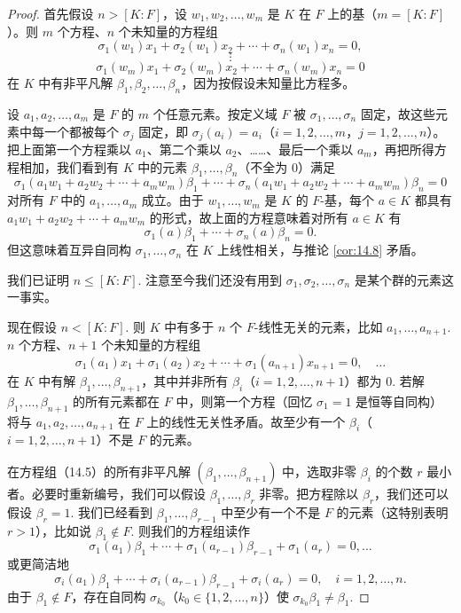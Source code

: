 \begin{proof}
首先假设 \(n > [K:F]\)，设 \(w_1, w_2, \ldots, w_m\) 是 \(K\) 在 \(F\) 上的基（\(m = [K:F]\)）。则 \(m\) 个方程、\(n\) 个未知量的方程组
\[
\sigma_1(w_1)x_1+\sigma_2(w_1)x_2+\cdots+\sigma_n(w_1)x_n = 0,
\]
\[
\vdots
\]
\[
\sigma_1(w_m)x_1+\sigma_2(w_m)x_2+\cdots+\sigma_n(w_m)x_n = 0
\]
在 \(K\) 中有非平凡解 \(\beta_1, \beta_2, \ldots, \beta_n\)，因为按假设未知量比方程多。

设 \(a_1, a_2, \ldots, a_m\) 是 \(F\) 的 \(m\) 个任意元素。按定义域 \(F\) 被 \(\sigma_1, \ldots, \sigma_n\) 固定，故这些元素中每一个都被每个 \(\sigma_j\) 固定，即 \(\sigma_j(a_i) = a_i\)（\(i = 1, 2, \ldots, m\)，\(j = 1, 2, \ldots, n\)）。把上面第一个方程乘以 \(a_1\)、第二个乘以 \(a_2\)、……、最后一个乘以 \(a_m\)，再把所得方程相加，我们看到有 \(K\) 中的元素 \(\beta_1, \ldots, \beta_n\)（不全为 0）满足
\[
\sigma_1(a_1w_1+a_2w_2+\cdots+a_mw_m)\beta_1+\cdots+\sigma_n(a_1w_1+a_2w_2+\cdots+a_mw_m)\beta_n = 0
\]
对所有 \(F\) 中的 \(a_1, \ldots, a_m\) 成立。由于 \(w_1, \ldots, w_m\) 是 \(K\) 的 \(F\)-基，每个 \(a \in K\) 都具有 \(a_1w_1+a_2w_2+\cdots+a_mw_m\) 的形式，故上面的方程意味着对所有 \(a \in K\) 有
\[
\sigma_1(a)\beta_1+\cdots+\sigma_n(a)\beta_n = 0.
\]
但这意味着互异自同构 \(\sigma_1, \ldots, \sigma_n\) 在 \(K\) 上线性相关，与推论 \ref{cor:14.8} 矛盾。

我们已证明 \(n \leq [K:F]\). 注意至今我们还没有用到 \(\sigma_1, \sigma_2, \ldots, \sigma_n\) 是某个群的元素这一事实。

现在假设 \(n < [K:F]\). 则 \(K\) 中有多于 \(n\) 个 \(F\)-线性无关的元素，比如 \(a_1, \ldots, a_{n+1}\). \(n\) 个方程、\(n+1\) 个未知量的方程组
\begin{equation}
\sigma_1(a_1)x_1+\sigma_1(a_2)x_2+\cdots+\sigma_1(a_{n+1})x_{n+1} = 0, \quad \ldots \tag{14.5}
\end{equation}
在 \(K\) 中有解 \(\beta_1, \ldots, \beta_{n+1}\)，其中并非所有 \(\beta_i\)（\(i = 1, 2, \ldots, n+1\)）都为 0. 若解 \(\beta_1, \ldots, \beta_{n+1}\) 的所有元素都在 \(F\) 中，则第一个方程（回忆 \(\sigma_1 = 1\) 是恒等自同构）将与 \(a_1, a_2, \ldots, a_{n+1}\) 在 \(F\) 上的线性无关性矛盾。故至少有一个 \(\beta_i\)（\(i = 1, 2, \ldots, n+1\)）不是 \(F\) 的元素。

在方程组（14.5）的所有非平凡解 \((\beta_1, \ldots, \beta_{n+1})\) 中，选取非零 \(\beta_i\) 的个数 \(r\) 最小者。必要时重新编号，我们可以假设 \(\beta_1, \ldots, \beta_r\) 非零。把方程除以 \(\beta_r\)，我们还可以假设 \(\beta_r = 1\). 我们已经看到 \(\beta_1, \ldots, \beta_{r-1}\) 中至少有一个不是 \(F\) 的元素（这特别表明 \(r > 1\)），比如说 \(\beta_1 \notin F\). 则我们的方程组读作
\begin{equation}
\sigma_1(a_1)\beta_1+\cdots+\sigma_1(a_{r-1})\beta_{r-1}+\sigma_1(a_r) = 0, \ldots \tag{14.6}
\end{equation}
或更简洁地
\begin{equation}
\sigma_i(a_1)\beta_1+\cdots+\sigma_i(a_{r-1})\beta_{r-1}+\sigma_i(a_r) = 0, \quad i = 1, 2, \ldots, n. \tag{14.7}
\end{equation}
由于 \(\beta_1 \notin F\)，存在自同构 \(\sigma_{k_0}\)（\(k_0 \in \{1, 2, \ldots, n\}\)）使 \(\sigma_{k_0}\beta_1 \neq \beta_1\).


\end{proof}
